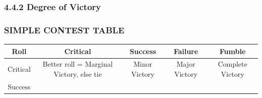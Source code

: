\documentclass[
]{article}
\begin{document}
\hypertarget{degree-of-victory}{%
\subsubsection{4.4.2 Degree of Victory}\label{degree-of-victory}}

\hypertarget{simple-contest-table}{%
\subsubsection{SIMPLE CONTEST TABLE}\label{simple-contest-table}}

\begin{longtable}[]{@{}ccccc@{}}
\toprule
\begin{minipage}[b]{0.10\columnwidth}\centering
Roll\strut
\end{minipage} & \begin{minipage}[b]{0.18\columnwidth}\centering
Critical\strut
\end{minipage} & \begin{minipage}[b]{0.19\columnwidth}\centering
Success\strut
\end{minipage} & \begin{minipage}[b]{0.19\columnwidth}\centering
Failure\strut
\end{minipage} & \begin{minipage}[b]{0.19\columnwidth}\centering
Fumble\strut
\end{minipage}\tabularnewline
\midrule
\endhead
\begin{minipage}[t]{0.10\columnwidth}\centering
Critical\strut
\end{minipage} & \begin{minipage}[t]{0.18\columnwidth}\centering
Better roll = Marginal Victory, else tie\strut
\end{minipage} & \begin{minipage}[t]{0.19\columnwidth}\centering
Minor Victory\strut
\end{minipage} & \begin{minipage}[t]{0.19\columnwidth}\centering
Major Victory\strut
\end{minipage} & \begin{minipage}[t]{0.19\columnwidth}\centering
Complete Victory\strut
\end{minipage}\tabularnewline
\begin{minipage}[t]{0.10\columnwidth}\centering
Success\strut
\end{minipage} & \begin{minipage}[t]{0.18\columnwidth}\centering

\end{minipage}
\end{longtable}
\end{document}
